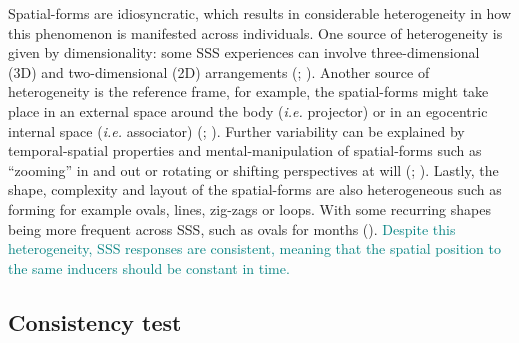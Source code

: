 \documentclass[
  man,
  floatsintext,
  longtable,
  a4paper,
  nolmodern,
  notxfonts,
  notimes,
  colorlinks=true,linkcolor=blue,citecolor=blue,urlcolor=blue]{apa7}
\begin{document}
Spatial-forms are idiosyncratic,
which results in considerable heterogeneity in how this phenomenon is
manifested across individuals. One source of heterogeneity is given by
dimensionality: some SSS experiences can involve three-dimensional (3D)
and two-dimensional (2D) arrangements
(;
). Another source of
heterogeneity is the reference frame, for example, the spatial-forms
might take place in an external space around the body (\emph{i.e.}
projector) or in an egocentric internal space (\emph{i.e.} associator)
(;
). Further variability can
be explained by temporal-spatial properties and mental-manipulation of
spatial-forms such as ``zooming'' in and out or rotating or shifting
perspectives at will (;
). Lastly, the shape,
complexity and layout of the spatial-forms are also heterogeneous such
as forming for example ovals, lines, zig-zags or loops. With some
recurring shapes being more frequent across SSS, such as ovals for
months ().
\textcolor{teal}{Despite this heterogeneity, SSS responses are consistent, meaning that the spatial position to the same inducers should be constant in time.}

\subsection{Consistency test}\label{sec-consistency-tests}


\end{document}

